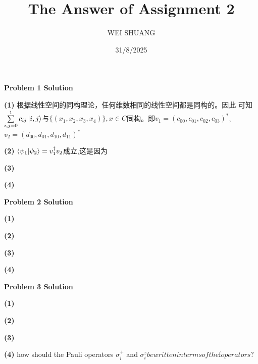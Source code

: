 \documentclass[12pt]{article}
\title{The Answer of Assignment 2}
\author{WEI SHUANG}
\date{31/8/2025}
\begin{document}
\maketitle

\begin{center}
    \textbf{Problem 1 Solution}
\end{center}

\textbf{(1)}
根据线性空间的同构理论，任何维数相同的线性空间都是同构的。因此  
可知$\sum\limits_{i,j=0}^{1}c_{ij}\ket{i,j}$与$\{(x_1,x_2,x_3,x_4)\},x\in C$同构。即$v_1=(c_{00},c_{01},c_{02},c_{03})^*$,$v_2=(d_{00},d_{01},d_{10},d_{11})^*$




\textbf{(2)}
$\braket{\psi_1|\psi_2}=v_1^\dagger v_2$成立,这是因为

\textbf{(3)}

\textbf{(4)}
\begin{center}
    \textbf{Problem 2 Solution}
\end{center}

\textbf{(1)}

\textbf{(2)}

\textbf{(3)}

\textbf{(4)}

\begin{center}
    \textbf{Problem 3 Solution}
\end{center}

\textbf{(1)}

\textbf{(2)}

\textbf{(3)}

\textbf{(4)}
how should the Pauli operators $\sigma_i^+$ and $\sigma_i^z be written in terms of the  $f$ operators? $
\end{document}
